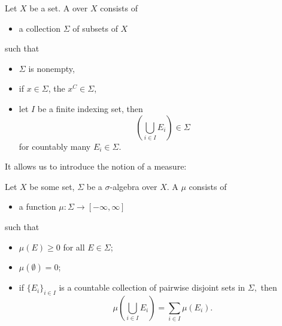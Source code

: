 
\begin{defn}%
Let $X$ be a set. A  over $X$ consists of
\begin{itemize}
\item a collection $\Sigma$ of subsets of $X$
\end{itemize}
such that
\begin{itemize}
\item $\Sigma$ is nonempty,
\item if $x\in\Sigma$, the $x^{C}\in\Sigma$,
\item let $I$ be a finite indexing set, then
$$\left(\bigcup_{i \in I} E_i\right) \in\Sigma$$
 for countably many $E_i\in\Sigma$.
\end{itemize}
\end{defn}

It allows us to introduce the notion of a measure:

\begin{defn}%
Let $X$ be some set, $\Sigma$ be a $\sigma$-algebra over $X$. A
 $\mu$ consists of
\begin{itemize}
\item a function $\mu:\Sigma\to[-\infty,\infty]$
\end{itemize}
such that
\begin{itemize}
\item $\mu(E)\geq0$ for all $E\in\Sigma$;
\item $\mu(\emptyset)=0$;
\item if $\{E_{i}\}_{i\in{I}}$ is a countable collection of
  pairwise disjoint sets in $\Sigma,$ then
$$ \mu\left(\bigcup_{i \in I} E_i\right) = \sum_{i \in I} \mu(E_i).$$
\end{itemize}
\end{defn}
